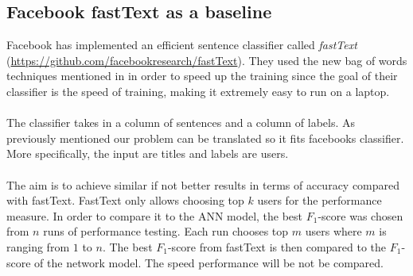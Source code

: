 \subsection{Facebook fastText as a baseline}
Facebook has implemented an efficient sentence classifier called \textit{fastText} (\url{https://github.com/facebookresearch/fastText}). They used the new bag of words techniques mentioned in \parencite{joulin2016bag} in order to speed up the training since the goal of their classifier is the speed of training, making it extremely easy to run on a laptop. 
\\\\
The classifier takes in a column of sentences and a column of labels. As previously mentioned our problem can be translated so it fits facebooks classifier. More specifically, the input are titles and labels are users. \\\\
The aim is to achieve similar if not better results in terms of accuracy compared with fastText.  FastText only allows choosing top $k$ users for the performance measure. In order to compare it to the ANN model, the best $F_1$-score was chosen from $n$ runs of performance testing. Each run chooses top $m$ users where $m$ is ranging from $1$ to $n$. The best $F_1$-score from fastText is then compared to the $F_1$-score of the network model.
The speed performance will be not be compared.